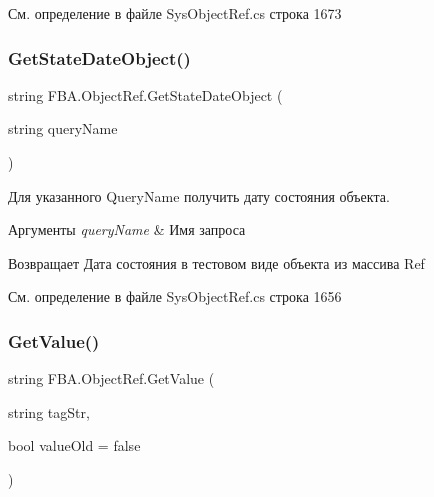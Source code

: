 См. определение в файле Sys\+Object\+Ref.\+cs строка 1673

\mbox{\label{class_f_b_a_1_1_object_ref_ae55bdfa098646198acb8c48bfaa70d82}} 
\subsubsection{\texorpdfstring{Get\+State\+Date\+Object()}{GetStateDateObject()}}
{\footnotesize\ttfamily string F\+B\+A.\+Object\+Ref.\+Get\+State\+Date\+Object (\begin{DoxyParamCaption}\item[{string}]{query\+Name }\end{DoxyParamCaption})}



Для указанного Query\+Name получить дату состояния объекта. 


\begin{DoxyParams}{Аргументы}
{\em query\+Name} & Имя запроса\\
\hline
\end{DoxyParams}
\begin{DoxyReturn}{Возвращает}
Дата состояния в тестовом виде объекта из массива Ref
\end{DoxyReturn}


См. определение в файле Sys\+Object\+Ref.\+cs строка 1656

\mbox{\label{class_f_b_a_1_1_object_ref_a6d626d17a5138978eade81bffca0e0eb}} 
\subsubsection{\texorpdfstring{Get\+Value()}{GetValue()}}
{\footnotesize\ttfamily string F\+B\+A.\+Object\+Ref.\+Get\+Value (\begin{DoxyParamCaption}\item[{string}]{tag\+Str,  }\item[{bool}]{value\+Old = {\ttfamily false} }\end{DoxyParamCaption})}



